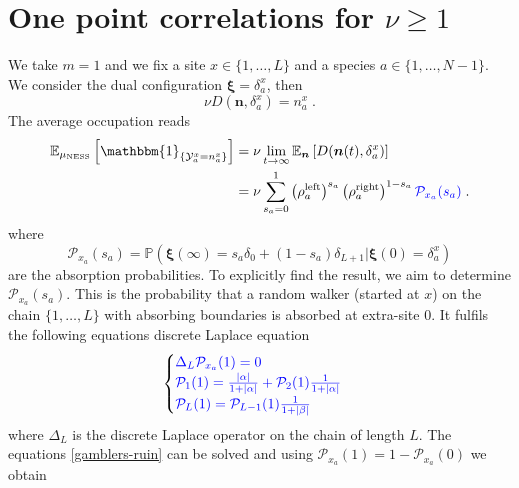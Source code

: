 \documentclass[10pt]{article}
\numberwithin{equation}{section}
\numberwithin{equation}{subsection}
\newcommand{\dt}{\;.}
\newcommand{\fra}[1]{\textcolor[rgb]{0,0,1}{#1}}
\begin{document}
{\section{One point correlations for $\nu\geq 1$}\label{appendix-1pts-general}
We take $m=1$ and we fix a site $x\in\{1,\ldots,L\}$ and a species $a\in \{1,\ldots,N-1\}$. We consider the dual configuration $\bm{\xi}=\delta_{a}^{x}$, then 
\begin{equation}
	\nu D(\bm{n},\delta_{a}^{x})=n_{a}^{x}\dt
\end{equation}
The average occupation reads
\begin{equation}\label{OnePtsCORR}
	\begin{split}
			\mathbb{E}_{\mu_{\text{NESS}}}\left[\mathbbm{1}_{\{\mathcal{Y}_{a}^{x}=n_{a}^{x}\}}\right]&=\nu\lim_{t\to\infty}\mathbb{E}_{\bm{n}}\left[D(\bm{n}(t),\delta_{a}^{x})\right]\\&=\nu\sum_{s_{a}=0}^{1}\left(\rho_{a}^{\text{left}}\right)^{s_{a}}\left(\rho_{a}^{\text{right}}\right)^{1-s_{a}}\fra{\mathcal{P}_{x_{a}}(s_{a})}\dt
	\end{split}
\end{equation}
\fra{where 
\begin{equation*}
	\mathcal{P}_{x_{a}}(s_{a})=\mathbb{P}\left(\bm{\xi}(\infty)=s_{a}\delta_{0}+(1-s_{a})\delta_{L+1}|\bm{\xi}(0)=\delta_{a}^{x}\right)
\end{equation*} are the absorption probabilities.}
\fra{To explicitly find the result, we aim to determine $\mathcal{P}_{x_{a}}(s_{a})$.}%
This is the probability that a random walker 
(started at $x$) on the chain $\{1,\ldots,L\}$ with absorbing boundaries {\color{black}is absorbed at extra-site $0$. It fulfils the following equations discrete Laplace equation}
\begin{equation}\label{gamblers-ruin}
	\begin{cases}
		\fra{\Delta_{L}\mathcal{P}_{x_{a}}(1)=0}\\
		\fra{\mathcal{P}_{1}(1)=\frac{|\alpha|}{1+|\alpha|}+\mathcal{P}_{2}(1)\frac{1}{1+|\alpha|}}\\
		\fra{\mathcal{P}_{L}(1)=\mathcal{P}_{L-1}(1)\frac{1}{1+|\beta|}}
	\end{cases}
\end{equation}
where $\Delta_{L}$ is the discrete Laplace operator on the chain of length $L$. The equations \eqref{gamblers-ruin} can be solved and using \fra{$\mathcal{P}_{x_{a}}(1)=1-\mathcal{P}_{x_{a}}(0)$} we obtain 
}
\end{document}
